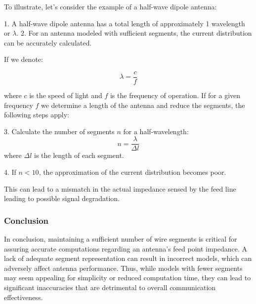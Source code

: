 To illustrate, let’s consider the example of a half-wave dipole antenna:

1. A half-wave dipole antenna has a total length of approximately 1 wavelength or \(\lambda\).
2. For an antenna modeled with sufficient segments, the current distribution can be accurately calculated.

If we denote:

\[
\lambda = \frac{c}{f}
\]

where \(c\) is the speed of light and \(f\) is the frequency of operation. If for a given frequency \(f\) we determine a length of the antenna and reduce the segments, the following steps apply:

3. Calculate the number of segments \(n\) for a half-wavelength:
   \[
   n = \frac{\lambda}{\Delta l}
   \]
   where \(\Delta l\) is the length of each segment.

4. If \(n < 10\), the approximation of the current distribution becomes poor.

This can lead to a mismatch in the actual impedance sensed by the feed line leading to possible signal degradation.

\subsubsection{Conclusion}

In conclusion, maintaining a sufficient number of wire segments is critical for assuring accurate computations regarding an antenna's feed point impedance. A lack of adequate segment representation can result in incorrect models, which can adversely affect antenna performance. Thus, while models with fewer segments may seem appealing for simplicity or reduced computation time, they can lead to significant inaccuracies that are detrimental to overall communication effectiveness.

\begin{center}
\end{center}